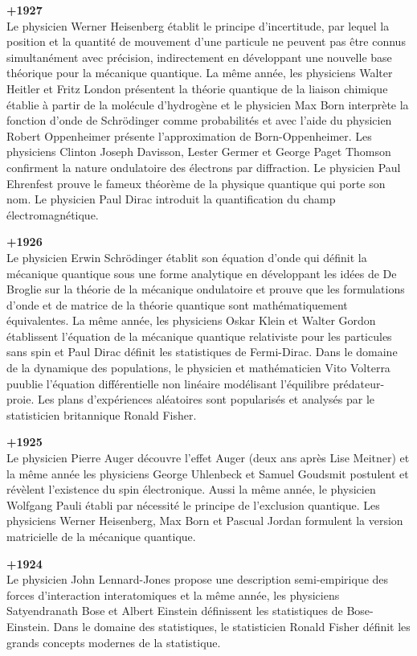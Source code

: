 \textbf{+1927}\\
Le physicien Werner Heisenberg établit le principe d'incertitude, par lequel la position et la quantité de mouvement d'une particule ne peuvent pas être connus simultanément avec précision, indirectement en développant une nouvelle base théorique pour la mécanique quantique. La même année, les physiciens Walter Heitler et Fritz London présentent la théorie quantique de la liaison chimique établie à partir de la molécule d'hydrogène et le physicien Max Born interprète la fonction d'onde de Schrödinger comme probabilités et avec l'aide du physicien Robert Oppenheimer présente l'approximation de Born-Oppenheimer. Les physiciens Clinton Joseph Davisson, Lester Germer et George Paget Thomson confirment la nature ondulatoire des électrons par diffraction. Le physicien Paul Ehrenfest prouve le fameux théorème de la physique quantique qui porte son nom. Le physicien Paul Dirac introduit la quantification du champ électromagnétique.

\textbf{+1926}\\
Le physicien Erwin Schrödinger établit son équation d'onde qui définit la mécanique quantique sous une forme analytique en développant les idées de De Broglie sur la théorie de la mécanique ondulatoire et prouve que les formulations d'onde et de matrice de la théorie quantique sont mathématiquement équivalentes. La même année, les physiciens Oskar Klein et Walter Gordon établissent l'équation de la mécanique quantique relativiste pour les particules sans spin et Paul Dirac définit les statistiques de Fermi-Dirac. Dans le domaine de la dynamique des populations, le physicien et mathématicien Vito Volterra puublie l'équation différentielle non linéaire modélisant l'équilibre prédateur-proie. Les plans d'expériences aléatoires sont popularisés et analysés par le statisticien britannique Ronald Fisher.

\textbf{+1925}\\
Le physicien Pierre Auger découvre l'effet Auger (deux ans après Lise Meitner) et la même année les physiciens George Uhlenbeck et Samuel Goudsmit postulent et révèlent l'existence du spin électronique. Aussi la même année, le physicien Wolfgang Pauli établi par nécessité le principe de l'exclusion quantique. Les physiciens Werner Heisenberg, Max Born et Pascual Jordan formulent la version matricielle de la mécanique  quantique.

\textbf{+1924}\\
Le physicien John Lennard-Jones propose une description semi-empirique des forces d'interaction interatomiques et la même année, les physiciens Satyendranath Bose et Albert Einstein définissent les statistiques de Bose-Einstein. Dans le domaine des statistiques, le statisticien Ronald Fisher définit les grands concepts modernes de la statistique.

